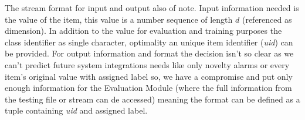 
The stream format for input and output also of note.
Input information needed is the value of the item, this value is a number
sequence of length $d$ (referenced as dimension).
In addition to the value for evaluation and training purposes the class
identifier as single character, optimality an unique item identifier
(\textit{uid}) can be provided.
For output information and format the decision isn't so clear as we can't
predict future system integrations needs like only novelty alarms or every
item's original value with assigned label so, we have a compromise and put only
enough information for the Evaluation Module (where the full information
from the testing file or stream can de accessed) meaning the format can be
defined as a tuple containing \textit{uid} and assigned label.



